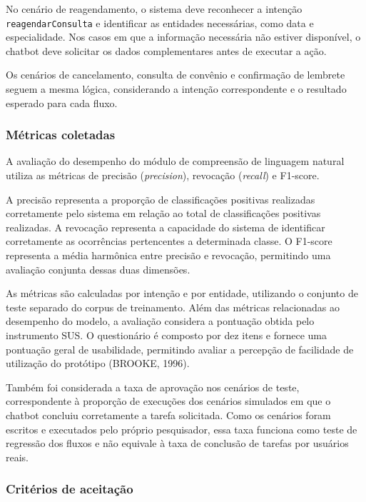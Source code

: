 \documentclass[12pt,a4paper]{extarticle}
\begin{document}
No cenário de reagendamento, o sistema deve reconhecer a intenção \newline \texttt{reagendarConsulta} e identificar as entidades necessárias, como data e especialidade. Nos casos em que a informação necessária não estiver disponível, o chatbot deve solicitar os dados complementares antes de executar a ação.

Os cenários de cancelamento, consulta de convênio e confirmação de lembrete seguem a mesma lógica, considerando a intenção correspondente e o resultado esperado para cada fluxo.

\subsubsection{Métricas coletadas}
\label{sec:metricas-metodo}

A avaliação do desempenho do módulo de compreensão de linguagem natural utiliza as métricas de precisão (\textit{precision}), revocação (\textit{recall}) e F1-score.

A precisão representa a proporção de classificações positivas realizadas corretamente pelo sistema em relação ao total de classificações positivas realizadas. A revocação representa a capacidade do sistema de identificar corretamente as ocorrências pertencentes a determinada classe. O F1-score representa a média harmônica entre precisão e revocação, permitindo uma avaliação conjunta dessas duas dimensões.

As métricas são calculadas por intenção e por entidade, utilizando o conjunto de teste separado do corpus de treinamento.
Além das métricas relacionadas ao desempenho do modelo, a avaliação considera a pontuação obtida pelo instrumento SUS. O questionário é composto por dez itens e fornece uma pontuação geral de usabilidade, permitindo avaliar a percepção de facilidade de utilização do protótipo (BROOKE, 1996).

Também foi considerada a taxa de aprovação nos cenários de teste, correspondente à proporção de execuções dos cenários simulados em que o chatbot concluiu corretamente a tarefa solicitada. Como os cenários foram escritos e executados pelo próprio pesquisador, essa taxa funciona como teste de regressão dos fluxos e não equivale à taxa de conclusão de tarefas por usuários reais.

\subsubsection{Critérios de aceitação}
\label{sec:criterios-metodo}
\end{document}
